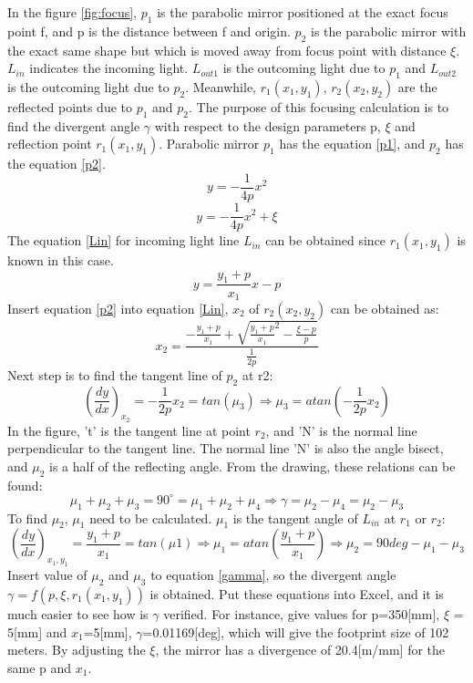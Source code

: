 In the figure \ref{fig:focus}, $p_{1}$ is the parabolic mirror positioned at the exact focus point f, and p is the distance between f and origin. $p_{2}$ is the parabolic mirror with the exact same shape but which is moved away from focus point with distance $\xi$. $L_{in}$ indicates the incoming light. $L_{out1}$ is the outcoming light due to $p_{1}$ and $L_{out2}$ is the outcoming light due to $p_{2}$. Meanwhile, $r_{1}(x_{1}, y_{1})$, $r_{2}(x_{2}, y_{2})$ are the reflected points due to $p_{1}$ and $p_{2}$. The purpose of this focusing calculation is to find the divergent angle $\gamma$ with respect to the design parameters p, $\xi$ and reflection point $r_{1}(x_{1}, y_{1})$. \cite{parabolic_wiki}Parabolic mirror $p_{1}$ has the equation \ref{p1}, and $p_{2}$ has the equation \ref{p2}. 
\begin{equation}
\label{p1}
y = -\frac{1}{4p}x^{2}
\end {equation}
\begin{equation}
\label{p2}
y = -\frac{1}{4p}x^{2}+\xi
\end {equation}
The equation \ref{Lin} for incoming light line $L_{in}$ can be obtained since $r_{1}(x_{1}, y_{1})$ is known in this case. 
\begin{equation}
\label{Lin}
y = \frac{y_{1}+p}{x_{1}}x-p
\end {equation}
Insert equation \ref{p2} into equation \ref{Lin}, $x_{2}$ of $r_{2}(x_{2}, y_{2})$ can be obtained as:
\begin{equation}
\label{x2}
x_{2} = \frac{-\frac{y_{1}+p}{x_{1}}+\sqrt{{\frac{y_{1}+p}{x_{1}}}^2-\frac{\xi-p}{p}}}{\frac{1}{2p}}
\end {equation}
Next step is to find the tangent line of $p_{2}$ at r2:
\begin{equation}
\label{miu3}
(\frac{dy}{dx})_{x_{2}} = -\frac{1}{2p}x_{2} = tan(\mu_{3}) \Rightarrow \mu_{3} = atan(-\frac{1}{2p}x_{2})
\end {equation}
In the figure, 't' is the tangent line at point $r_{2}$, and 'N' is the normal line perpendicular to the tangent line. The normal line 'N' is also the angle bisect, and $\mu_{2}$ is a half of the reflecting angle. From the drawing, these relations can be found:
\begin{equation}
\label{gamma}
\mu_{1}+\mu_{2}+\mu_{3} = 90^{\circ} = \mu_{1}+\mu_{2}+\mu_{4}
\Longrightarrow \gamma = \mu_{2} - \mu_{4} = \mu_{2} - \mu_{3} 
\end {equation}
To find $\mu_{2}$, $\mu_{1}$ need to be calculated. $\mu_{1}$ is the tangent angle of $L_{in}$ at $r_{1}$ or $r_{2}$:
\begin{equation}
\label{miu2}
(\frac{dy}{dx})_{x_{1},y_{1}} = \frac{y_{1}+p}{x_{1}} = tan(\mu{1})\Rightarrow \mu_{1} = atan(\frac{y_{1}+p}{x_{1}}) \Rightarrow \mu_{2} = 90deg - \mu_{1} - \mu_{3}
\end {equation}
Insert value of $\mu_{2}$ and $\mu_{3}$ to equation \ref{gamma}, so the divergent angle $\gamma = f(p, \xi, r_{1}(x_{1}, y_{1}))$ is obtained. Put these equations into Excel, and it is much easier to see how is $\gamma$ verified. For instance, give values for p=350[mm], $\xi$ = 5[mm] and $x_{1}$=5[mm], $\gamma$=0.01169[deg], which will give the footprint size of 102 meters. By adjusting the $\xi$, the mirror has a divergence of 20.4[m/mm] for the same p and $x_{1}$.